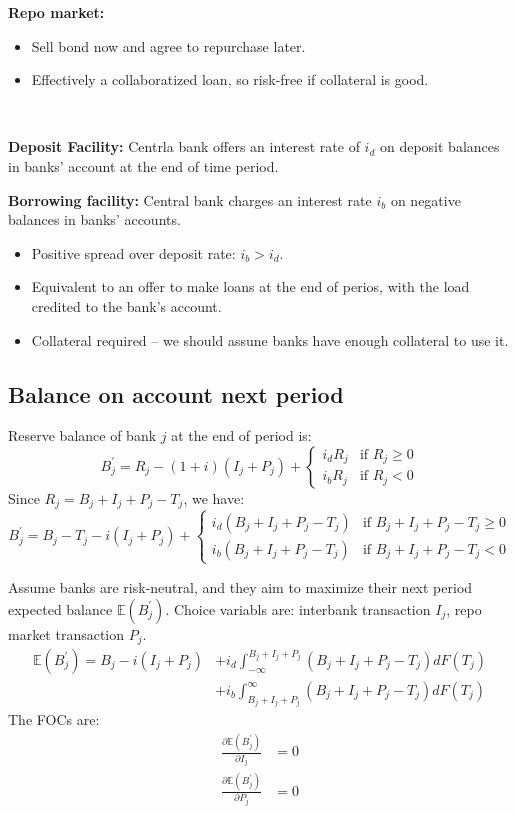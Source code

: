\textbf{Repo market:}
\begin{itemize}
    \item Sell bond now and agree to repurchase later.
    \item Effectively a collaboratized loan, so risk-free if collateral is good.
\end{itemize}

\begin{note}
    \ 

    \textbf{Deposit Facility:} Centrla bank offers an interest rate of $i_d$ on deposit balances in banks' account at the end of time period.

    \textbf{Borrowing facility:} Central bank charges an interest rate $i_b$ on negative balances in banks' accounts.
    \begin{itemize}
        \item Positive spread over deposit rate: $i_b > i_d$.
        \item Equivalent to an offer to make loans at the end of perios, with the load credited to the bank's account.
        \item Collateral required -- we should assune banks have enough collateral to use it.
    \end{itemize}
\end{note}

\subsection{Balance on account next period}

Reserve balance of bank $j$ at the end of period is:
\[
B^{\prime} _j = R_j - (1+i)(I_j + P_j) + \left\{\begin{matrix}
   i_d R_j & \text{if } R_j \geq 0\\
   i_b R_j & \text{if } R_j < 0
  \end{matrix}\right.
\]
Since $R_j = B_j + I_j + P_j - T_j$, we have:
\[
B^{\prime} _j = B_j - T_j - i(I_j + P_j) + \left\{\begin{matrix}
   i_d (B_j + I_j + P_j - T_j) & \text{if } B_j + I_j + P_j - T_j \geq 0\\
   i_b (B_j + I_j + P_j - T_j) & \text{if } B_j + I_j + P_j - T_j < 0
  \end{matrix}\right.
\]

Assume banks are risk-neutral, and they aim to maximize their next period expected balance $\mathbb{E}(B^{\prime}_j)$.
Choice variabls are: interbank transaction $I_j$, repo market transaction $P_j$.
\begin{align*}
    \mathbb{E}(B^{\prime}_j) = B_j - i(I_j + P_j) &+ i_d \int_{-\infty}^{B_j + I_j + P_j} (B_j + I_j + P_j - T_j) dF(T_j) \\
    &+ i_b \int_{B_j + I_j + P_j}^{\infty} (B_j + I_j + P_j - T_j) dF(T_j)
\end{align*}
The FOCs are:
\begin{align*}
    \frac{\partial \mathbb{E}(B^{\prime}_j)}{\partial I_j} &= 0 \\
    \frac{\partial \mathbb{E}(B^{\prime}_j)}{\partial P_j} &= 0
\end{align*}

